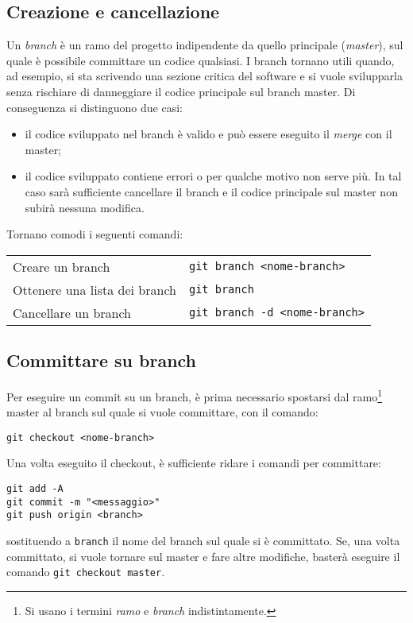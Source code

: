 \documentclass[a4paper, 11pt]{article}
\begin{document}
	\subsection{Creazione e cancellazione}
	Un \emph{branch} è un ramo del progetto indipendente da quello principale (\emph{master}), sul quale è possibile committare un codice qualsiasi. I branch tornano utili quando, ad esempio, si sta scrivendo una sezione critica del software e si vuole svilupparla senza rischiare di danneggiare il codice principale sul branch master. Di conseguenza si distinguono due casi:
	\begin{itemize}
		\item il codice sviluppato nel branch è valido e può essere eseguito il \emph{merge} con il master;
		\item il codice sviluppato contiene errori o per qualche motivo non serve più. In tal caso sarà sufficiente cancellare il branch e il codice principale sul master non subirà nessuna modifica.
	\end{itemize}
	\newpage
	Tornano comodi i seguenti comandi: 
	\begin{center}
			\begin{tabular}{ll}
				Creare un branch & \lstinline|git branch <nome-branch>| \\
				Ottenere una lista dei branch & \lstinline|git branch| \\
				Cancellare un branch & \lstinline|git branch -d <nome-branch>|
			\end{tabular}
	\end{center}
	
	\subsection{Committare su branch}
	Per eseguire un commit su un branch, è prima necessario spostarsi dal ramo\footnote{Si usano i termini \emph{ramo} e \emph{branch} indistintamente.} master al branch sul quale si vuole committare, con il comando: \begin{lstlisting}
git checkout <nome-branch>
	\end{lstlisting}
	
	Una volta eseguito il checkout, è sufficiente ridare i comandi per committare: \begin{lstlisting}
git add -A
git commit -m "<messaggio>"
git push origin <branch>
	\end{lstlisting}
	sostituendo a \lstinline|branch| il nome del branch sul quale si è committato. Se, una volta committato, si vuole tornare sul master e fare altre modifiche, basterà eseguire il comando \lstinline|git checkout master|.
	
\end{document}
